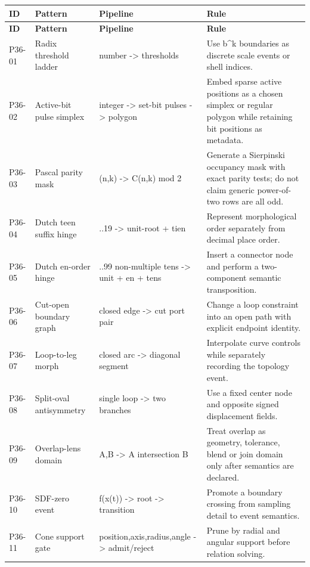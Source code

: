 \begin{longtable}{>{\raggedright\arraybackslash}p{1.1cm}>{\raggedright\arraybackslash}p{3.5cm}>{\raggedright\arraybackslash}p{4.2cm}>{\raggedright\arraybackslash}p{7.2cm}}
\toprule
\textbf{ID} & \textbf{Pattern} & \textbf{Pipeline} & \textbf{Rule} \\
\midrule
\endfirsthead
\toprule
\textbf{ID} & \textbf{Pattern} & \textbf{Pipeline} & \textbf{Rule} \\
\midrule
\endhead
P36-01 & Radix threshold ladder & number -> thresholds & Use b\textasciicircum{}k boundaries as discrete scale events or shell indices. \\
\addlinespace[1.5pt]
P36-02 & Active-bit pulse simplex & integer -> set-bit pulses -> polygon & Embed sparse active positions as a chosen simplex or regular polygon while retaining bit positions as metadata. \\
\addlinespace[1.5pt]
P36-03 & Pascal parity mask & (n,k) -> C(n,k) mod 2 & Generate a Sierpinski occupancy mask with exact parity tests; do not claim generic power-of-two rows are all odd. \\
\addlinespace[1.5pt]
P36-04 & Dutch teen suffix hinge & 13..19 -> unit-root + tien & Represent morphological order separately from decimal place order. \\
\addlinespace[1.5pt]
P36-05 & Dutch en-order hinge & 21..99 non-multiple tens -> unit + en + tens & Insert a connector node and perform a two-component semantic transposition. \\
\addlinespace[1.5pt]
P36-06 & Cut-open boundary graph & closed edge -> cut port pair & Change a loop constraint into an open path with explicit endpoint identity. \\
\addlinespace[1.5pt]
P36-07 & Loop-to-leg morph & closed arc -> diagonal segment & Interpolate curve controls while separately recording the topology event. \\
\addlinespace[1.5pt]
P36-08 & Split-oval antisymmetry & single loop -> two branches & Use a fixed center node and opposite signed displacement fields. \\
\addlinespace[1.5pt]
P36-09 & Overlap-lens domain & A,B -> A intersection B & Treat overlap as geometry, tolerance, blend or join domain only after semantics are declared. \\
\addlinespace[1.5pt]
P36-10 & SDF-zero event & f(x(t)) -> root -> transition & Promote a boundary crossing from sampling detail to event semantics. \\
\addlinespace[1.5pt]
P36-11 & Cone support gate & position,axis,radius,angle -> admit/reject & Prune by radial and angular support before relation solving. \\

\end{longtable}
